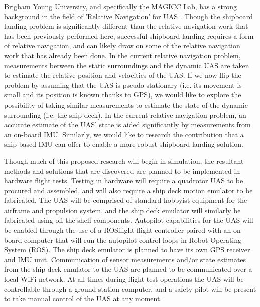\documentclass[12pt, letterpaper]{article}
\begin{document}
Brigham Young University, and specifically the MAGICC Lab, has a strong background in the field of 'Relative Navigation' for UAS \cite{Leishman2013}.  Though the shipboard landing problem is significantly different than the relative navigation work that has been previously performed here, successful shipboard landing requires a form of relative navigation, and can likely draw on some of the relative navigation work that has already been done.  In the current relative navigation problem, measurements between the static surroundings and the dynamic UAS are taken to estimate the relative position and velocities of the UAS.  If we now flip the problem by assuming that the UAS is pseudo-stationary (i.e. its movement is small and its position is known thanks to GPS), we would like to explore the possibility of taking similar measurements to estimate the state of the dynamic surrounding (i.e. the ship deck). In the current relative navigation problem, an accurate estimate of the UAS' state is aided significantly by measurements from an on-board IMU. Similarly, we would like to research the contribution that a ship-based IMU can offer to enable a more robust shipboard landing solution.

Though much of this proposed research will begin in simulation, the resultant methods and solutions that are discovered are planned to be implemented in hardware flight tests.  Testing in hardware will require a quadrotor UAS to be procured and assembled, and will also require a ship deck motion emulator to be fabricated.  The UAS will be comprised of standard hobbyist equipment for the airframe and propulsion system, and the ship deck emulator will similarly be fabricated using off-the-shelf components.  Autopilot capabilities for the UAS will be enabled through the use of a ROSflight flight controller paired with an on-board computer that will run the autopilot control loops in Robot Operating System (ROS).  The ship deck emulator is planned to have its own GPS receiver and IMU unit.  Communication of sensor measurements and/or state estimates from the ship deck emulator to the UAS are planned to be communicated over a local WiFi network.  At all times during flight test operations the UAS will be controllable through a ground-station computer, and a safety pilot will be present to take manual control of the UAS at any moment.  
\end{document}
